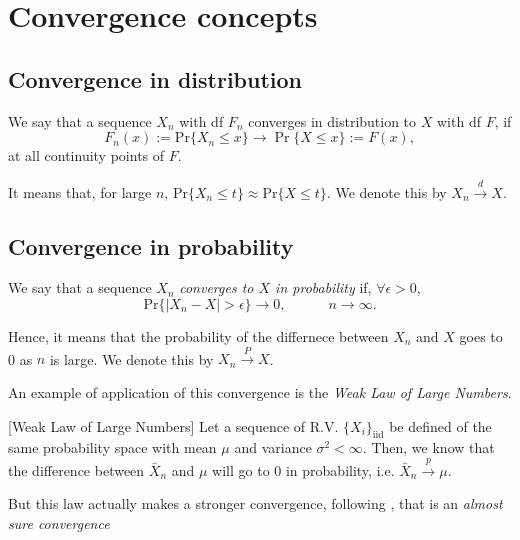 \section{Convergence concepts}\label{convconc}


\subsection*{Convergence in distribution}

\begin{definition}
We say that a sequence $X_n$ with df $F_n$ converges in distribution to $X$ with df $F$, if 
\begin{equation}
F_n(x):=\text{Pr}\big\{X_n\leq x\big\}\longrightarrow \Pr\{X\leq x\}:=F(x),
\end{equation}
at all continuity points of $F$. 
\end{definition}
It means that, for large $n$, $\text{Pr}\{X_n\leq t\}\approx\text{Pr}\{X\leq t\}$.
We denote this by $X_n\stackrel{d}{\to}X$.


\subsection*{Convergence in probability}

\begin{definition}
We say that a sequence $X_n$ \emph{converges to $X$ in probability} if, $\forall\epsilon>0$, 
\begin{equation}
\text{Pr}\Big\{|X_n-X|>\epsilon\Big\}\to 0, \qquad\quad n\to\infty.
\end{equation}
\end{definition}
Hence, it means that the probability of the differnece between $X_n$ and $X$ goes to 0 as $n$ is large.  We denote this by $X_n\stackrel{P}{\rightarrow}X$.

An example of application of this convergence is the \emph{Weak Law of Large Numbers}. 

\begin{theorem}\label{wlln}[Weak Law of Large Numbers]
Let a sequence of R.V. $\{X_i\}_{\text{iid}}$ be defined of the same probability space with mean $\mu$ and variance $\sigma^2<\infty$. Then, we know that the difference between $\bar{X}_n$  and $\mu$ will go to 0 in probability, i.e. $\bar{X}_n\stackrel{p}{\to}\mu$.
\end{theorem}

But this law actually makes a stronger convergence, following \citet{kolmogorov_foundations_1956}, that is an \emph{almost sure convergence}

